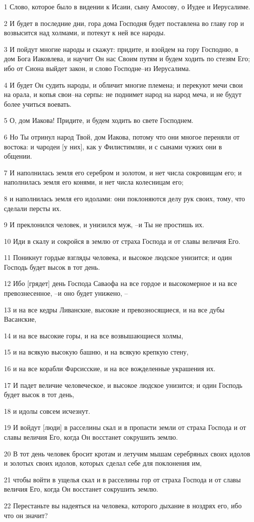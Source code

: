 \par 1 Слово, которое было в видении к Исаии, сыну Амосову, о Иудее и Иерусалиме.
\par 2 И будет в последние дни, гора дома Господня будет поставлена во главу гор и возвысится над холмами, и потекут к ней все народы.
\par 3 И пойдут многие народы и скажут: придите, и взойдем на гору Господню, в дом Бога Иаковлева, и научит Он нас Своим путям и будем ходить по стезям Его; ибо от Сиона выйдет закон, и слово Господне--из Иерусалима.
\par 4 И будет Он судить народы, и обличит многие племена; и перекуют мечи свои на орала, и копья свои--на серпы: не поднимет народ на народ меча, и не будут более учиться воевать.
\par 5 О, дом Иакова! Придите, и будем ходить во свете Господнем.
\par 6 Но Ты отринул народ Твой, дом Иакова, потому что они многое переняли от востока: и чародеи [у них], как у Филистимлян, и с сынами чужих они в общении.
\par 7 И наполнилась земля его серебром и золотом, и нет числа сокровищам его; и наполнилась земля его конями, и нет числа колесницам его;
\par 8 и наполнилась земля его идолами: они поклоняются делу рук своих, тому, что сделали персты их.
\par 9 И преклонился человек, и унизился муж, --и Ты не простишь их.
\par 10 Иди в скалу и сокройся в землю от страха Господа и от славы величия Его.
\par 11 Поникнут гордые взгляды человека, и высокое людское унизится; и один Господь будет высок в тот день.
\par 12 Ибо [грядет] день Господа Саваофа на все гордое и высокомерное и на все превознесенное, --и оно будет унижено, --
\par 13 и на все кедры Ливанские, высокие и превозносящиеся, и на все дубы Васанские,
\par 14 и на все высокие горы, и на все возвышающиеся холмы,
\par 15 и на всякую высокую башню, и на всякую крепкую стену,
\par 16 и на все корабли Фарсисские, и на все вожделенные украшения их.
\par 17 И падет величие человеческое, и высокое людское унизится; и один Господь будет высок в тот день,
\par 18 и идолы совсем исчезнут.
\par 19 И войдут [люди] в расселины скал и в пропасти земли от страха Господа и от славы величия Его, когда Он восстанет сокрушить землю.
\par 20 В тот день человек бросит кротам и летучим мышам серебряных своих идолов и золотых своих идолов, которых сделал себе для поклонения им,
\par 21 чтобы войти в ущелья скал и в расселины гор от страха Господа и от славы величия Его, когда Он восстанет сокрушить землю.
\par 22 Перестаньте вы надеяться на человека, которого дыхание в ноздрях его, ибо что он значит?

